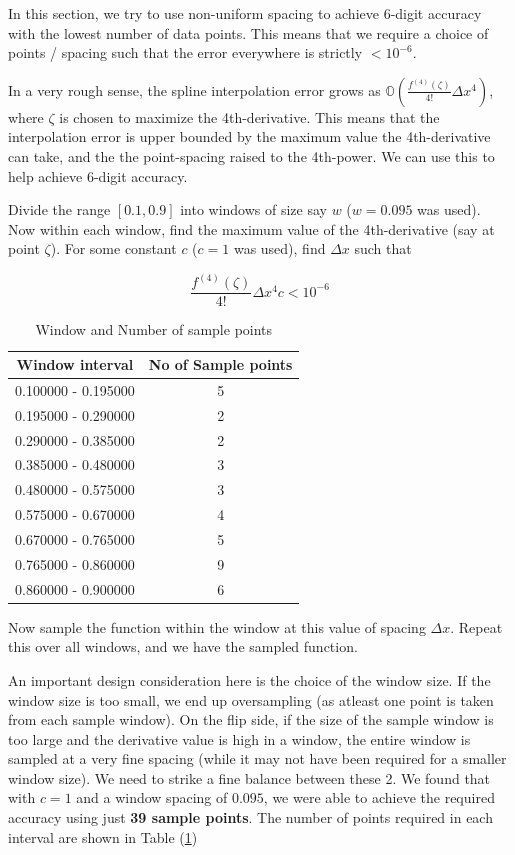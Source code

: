 \documentclass[11pt]{article}
\begin{document}
In this section, we try to use non-uniform spacing to achieve 6-digit accuracy with the lowest number of data points. This means that we require a choice of points / spacing such that the error everywhere is strictly $< 10^{-6}$. 

In a very rough sense, the spline interpolation error grows as $\mathbb{O}(\frac{f^{(4)}(\zeta)}{4!}\Delta x^4)$, where $\zeta$ is chosen to maximize the 4th-derivative. This means that the interpolation error is upper bounded by the maximum value the 4th-derivative can take, and the the point-spacing raised to the 4th-power. We can use this to help achieve 6-digit accuracy.

Divide the range $[0.1,0.9]$ into windows of size say $w$ ($w=0.095$ was used). Now within each window, find the maximum value of the 4th-derivative (say at point $\zeta$). For some constant $c$ ($c=1$ was used), find $\Delta x$ such that

\begin{equation}
\frac{f^{(4)}(\zeta)}{4!}\Delta x^4 c < 10^{-6}
\end{equation}


\begin{table}
\vspace{-1.5em}
\caption{Window and Number of sample points}
\renewcommand{\arraystretch}{1.0}
\label{tab:1}
\begin{tabular}{c|c} \toprule
Window interval & No of Sample points \\\midrule
0.100000 - 0.195000 & 5 \\
0.195000 - 0.290000 & 2 \\
0.290000 - 0.385000 & 2 \\
0.385000 - 0.480000 & 3 \\
0.480000 - 0.575000 & 3 \\
0.575000 - 0.670000 & 4 \\
0.670000 - 0.765000 & 5 \\
0.765000 - 0.860000 & 9 \\
0.860000 - 0.900000 & 6  \\\bottomrule
\end{tabular}
\end{table}

Now sample the function within the window at this value of spacing $\Delta x$. Repeat this over all windows, and we have the sampled function.

An important design consideration here is the choice of the window size. If the window size is too small, we end up oversampling (as atleast one point is taken from each sample window). On the flip side, if the size of the sample window is too large and the derivative value is high in a window, the entire window is sampled at a very fine spacing (while it may not have been required for a smaller window size). We need to strike a fine balance between these 2. We found that with $c=1$ and a window spacing of $0.095$, we were able to achieve the required accuracy using just \textbf{39 sample points}. The number of points required in each interval are shown in Table (\ref{tab:1})
\end{document}
